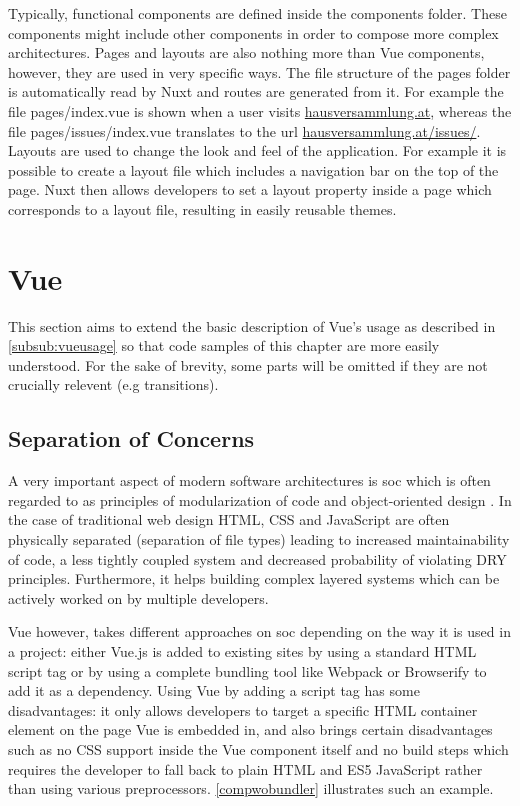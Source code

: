 Typically, functional components are defined inside the components folder. These components might include other components in order to compose more complex architectures. Pages and layouts are also nothing more than Vue components, however, they are used in very specific ways. The file structure of the pages folder is automatically read by Nuxt and routes are generated from it. For example the file pages/index.vue is shown when a user visits \url{hausversammlung.at}, whereas the file pages/issues/index.vue translates to the url \url{hausversammlung.at/issues/}. Layouts are used to change the look and feel of the application. For example it is possible to create a layout file which includes a navigation bar on the top of the page. Nuxt then allows developers to set a layout property inside a page which corresponds to a layout file, resulting in easily reusable themes. 

\section{Vue}
This section aims to extend the basic description of Vue's usage as described in \autoref{subsub:vueusage} so that code samples of this chapter are more easily understood. For the sake of brevity, some parts will be omitted if they are not crucially relevent (e.g transitions). 

\subsection{Separation of Concerns} \label{subsub:soc}
A very important aspect of modern software architectures is \acrfull{soc} which is often regarded to as principles of modularization of code and object-oriented design \cite{laplante2007every:book}. In the case of traditional web design HTML, CSS and JavaScript are often physically separated (separation of file types) leading to increased maintainability of code, a less tightly coupled system and decreased probability of violating DRY principles. Furthermore, it helps building complex layered systems which can be actively worked on by multiple developers. 

Vue however, takes different approaches on \acrshort{soc} depending on the way it is used in a project:
either Vue.js is added to existing sites by using a standard HTML script tag or by using a complete bundling tool like Webpack or Browserify to add it as a dependency. Using Vue by adding a script tag has some disadvantages: it only allows developers to target a specific HTML container element on the page Vue is embedded in, and also brings certain disadvantages such as no CSS support inside the Vue component itself and no build steps which requires the developer to fall back to plain HTML and ES5 JavaScript rather than using various preprocessors. \autoref{compwobundler} illustrates such an example.

